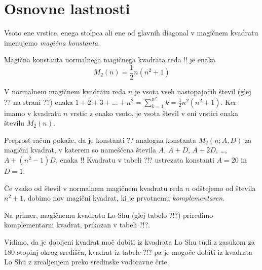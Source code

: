 \documentclass[a4paper,12pt]{article}
\begin{document}

\section{Osnovne lastnosti}

      Vsoto ene vrstice, enega stolpca ali ene od glavnih diagonal
      v magičnem kvadratu imenujemo \emph{magična konstanta}.

   Magična konstanta normalnega magičnega kvadrata reda !!
   je enaka
   \begin{equation}
      M_2(n) = \frac{1}{2} n(n^2+1)
   \end{equation}

   V normalnem magičnem kvadratu reda $n$ je vsota vseh nastopajočih
   števil (glej ?? na strani ??) enaka
   $1+2+3+\dots+n^2=\sum_{k=1}^{n^2}k=\frac{1}{2}n^2(n^2+1)$. Ker imamo
   v kvadratu $n$ vrstic z enako vsoto, je vsota števil v eni vrstici
   enaka številu $M_2(n)$. %

Preprost račun pokaže, da je konstanti ?? analogna konstanta
$M_2(n;A,D)$ za magični kvadrat, v katerem so nameščena števila
$A$, $A+D$, $A+2D$, \dots, $A+(n^2-1)D$, enaka %
!!
Kvadratu v tabeli ?!? ustrezata konstanti $A=20$ in $D=1$.

      Če vsako od števil v normalnem magičnem kvadratu reda $n$ odštejemo
      od števila $n^2+1$, dobimo nov magični kvadrat, ki je prvotnemu
      \emph{komplementaren}.

Na primer, magičnemu kvadratu Lo Shu (glej tabelo ?!?) priredimo
komplementarni kvadrat, prikazan v tabeli ?!?.
%

Vidimo, da je dobljeni kvadrat moč dobiti iz kvadrata Lo Shu tudi z zasukom za
180 stopinj okrog središča, kvadrat iz tabele ?!? pa je mogoče dobiti
iz kvadrata Lo Shu z zrcaljenjem preko sredinske vodoravne črte.
\end{document}
